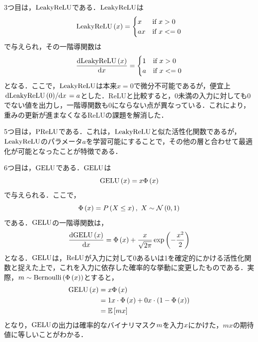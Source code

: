 3つ目は，$\text{LeakyReLU}$\cite{maas2013rectifier}である．$\text{LeakyReLU}$は
\begin{equation}
    \text{LeakyReLU}\left(x\right) =
    \begin{cases}
        x  & \text{if $x > 0$}  \\
        ax & \text{if $x <= 0$}
    \end{cases}
\end{equation}
で与えられ，その一階導関数は
\begin{equation}
    \dv{\text{LeakyReLU}\left(x\right)}{x} =
    \begin{cases}
        1 & \text{if $x > 0$}  \\
        a & \text{if $x <= 0$}
    \end{cases}
\end{equation}
となる．ここで，$\text{LeakyReLU}$は本来$x = 0$で微分不可能であるが，便宜上$\dv*{\text{LeakyReLU}\left(0\right)}{x} = a$とした．ReLUと比較すると，0未満の入力に対しても0でない値を出力し，一階導関数も0にならない点が異なっている．これにより，重みの更新が進まなくなるReLUの課題を解消した．

5つ目は，$\text{PReLU}$\cite{he2015delving}である．これは，$\text{LeakyReLU}$と似た活性化関数であるが，$\text{LeakyReLU}$のパラメータ$a$を学習可能にすることで，その他の層と合わせて最適化が可能となったことが特徴である．

6つ目は，$\text{GELU}$\cite{hendrycks2016gaussian}である．$\text{GELU}$は
\begin{equation}
    \text{GELU}\left(x\right) = x \Phi\left(x\right)
\end{equation}
で与えられる．ここで，
\begin{equation}
    \Phi\left(x\right) = P\left(X \le x\right), ~ X \sim \mathcal{N} \left(0, 1\right)
\end{equation}
である．$\text{GELU}$の一階導関数は，
\begin{equation}
    \dv{\text{GELU}\left(x\right)}{x} = \Phi\left(x\right) + \frac{x}{\sqrt{2\pi}}\exp\left(-\frac{x^{2}}{2}\right)
\end{equation}
となる．$\text{GELU}$は，$\text{ReLU}$が入力に対して0あるいは1を確定的にかける活性化関数と捉えた上で，これを入力に依存した確率的な挙動に変更したものである．実際，$m \sim \text{Bernoulli}\left(\Phi\left(x\right)\right)$とすると，
\begin{align}
    \text{GELU}\left(x\right) & = x \Phi\left(x\right)                                                             \\
                          & = 1 x \cdot \Phi\left(x\right) + 0 x \cdot \left(1 - \Phi\left(x\right)\right) \\
                          & = \mathbb{E}\left[mx\right]
\end{align}
となり，$\text{GELU}$の出力は確率的なバイナリマスク$m$を入力$x$にかけた，$mx$の期待値に等しいことがわかる．

